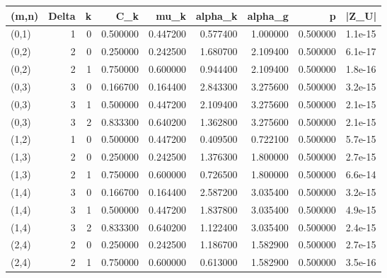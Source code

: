 \begin{tabular}{lrrrrrrrl}
\toprule
(m,n) & Delta & k & C_k & mu_k & alpha_k & alpha_g & p & |Z_U| \\
\midrule
(0,1) & 1 & 0 & 0.500000 & 0.447200 & 0.577400 & 1.000000 & 0.500000 & 1.1e-15 \\
(0,2) & 2 & 0 & 0.250000 & 0.242500 & 1.680700 & 2.109400 & 0.500000 & 6.1e-17 \\
(0,2) & 2 & 1 & 0.750000 & 0.600000 & 0.944400 & 2.109400 & 0.500000 & 1.8e-16 \\
(0,3) & 3 & 0 & 0.166700 & 0.164400 & 2.843300 & 3.275600 & 0.500000 & 3.2e-15 \\
(0,3) & 3 & 1 & 0.500000 & 0.447200 & 2.109400 & 3.275600 & 0.500000 & 2.1e-15 \\
(0,3) & 3 & 2 & 0.833300 & 0.640200 & 1.362800 & 3.275600 & 0.500000 & 2.1e-15 \\
(1,2) & 1 & 0 & 0.500000 & 0.447200 & 0.409500 & 0.722100 & 0.500000 & 5.7e-15 \\
(1,3) & 2 & 0 & 0.250000 & 0.242500 & 1.376300 & 1.800000 & 0.500000 & 2.7e-15 \\
(1,3) & 2 & 1 & 0.750000 & 0.600000 & 0.726500 & 1.800000 & 0.500000 & 6.6e-14 \\
(1,4) & 3 & 0 & 0.166700 & 0.164400 & 2.587200 & 3.035400 & 0.500000 & 3.2e-15 \\
(1,4) & 3 & 1 & 0.500000 & 0.447200 & 1.837800 & 3.035400 & 0.500000 & 4.9e-15 \\
(1,4) & 3 & 2 & 0.833300 & 0.640200 & 1.122400 & 3.035400 & 0.500000 & 2.4e-15 \\
(2,4) & 2 & 0 & 0.250000 & 0.242500 & 1.186700 & 1.582900 & 0.500000 & 2.7e-15 \\
(2,4) & 2 & 1 & 0.750000 & 0.600000 & 0.613000 & 1.582900 & 0.500000 & 3.5e-16 \\
\bottomrule
\end{tabular}
